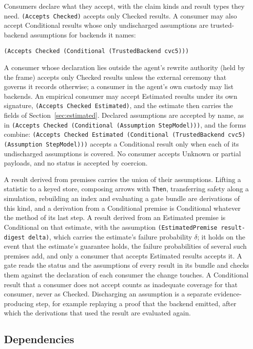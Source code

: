 \documentclass[11pt]{article}
\newcommand{\code}[1]{\texttt{#1}}
\theoremstyle{definition}
\theoremstyle{plain}
\begin{document}
Consumers declare what they accept, with the claim kinds and result types they need.
\code{(Accepts Checked)} accepts only Checked results. A consumer may also accept Conditional
results whose only undischarged assumptions are trusted-backend assumptions for backends it names:
\begin{lstlisting}
(Accepts Checked (Conditional (TrustedBackend cvc5)))
\end{lstlisting}
A consumer whose declaration lies outside the agent's rewrite authority (held by the frame) accepts
only Checked results unless the external ceremony that governs it records otherwise; a consumer in
the agent's own custody may list backends. An empirical consumer may accept Estimated results
under its own signature, \code{(Accepts Checked Estimated)}, and the estimate then carries the
fields of Section~\ref{sec:estimated}. Declared assumptions are accepted by name, as in
\code{(Accepts Checked (Conditional (Assumption StepModel)))}, and the forms combine:
\code{(Accepts Checked Estimated (Conditional (TrustedBackend cvc5) (Assumption StepModel)))} accepts
a Conditional result only when each of its undischarged assumptions is covered. No consumer accepts
Unknown or partial payloads, and no status is accepted by coercion.

A result derived from premises carries the union of their assumptions. Lifting a statistic to a
keyed store, composing arrows with \code{Then}, transferring safety along a simulation, rebuilding
an index and evaluating a gate bundle are derivations of this kind, and a derivation from a
Conditional premise is Conditional whatever the method of its last step. A result derived from an
Estimated premise is Conditional on that estimate, with the assumption
\code{(EstimatedPremise result-digest delta)}, which carries the estimate's failure probability
$\delta$; it holds on the event that the estimate's guarantee holds, the failure probabilities of
several such premises add, and only a consumer that accepts Estimated results accepts it. A gate
reads the status and the assumptions of every result in its bundle and checks them against the
declaration of each consumer the change touches. A Conditional result that a consumer does not
accept counts as inadequate coverage for that consumer, never as Checked. Discharging an assumption
is a separate evidence-producing step, for example replaying a proof that the backend emitted,
after which the derivations that used the result are evaluated again.

\subsection{Dependencies}\label{sec:deps}
\end{document}
